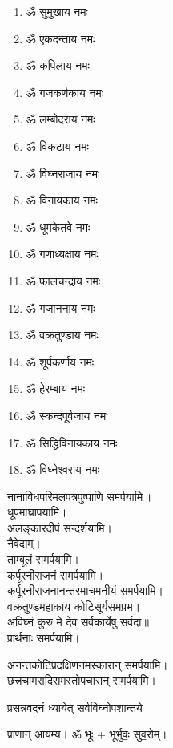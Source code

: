 \setlength{\columnseprule}{0pt}
\renewcommand{\labelenumi}{\devanumber\theenumi.}
\begin{multicols}{2}
\begin{enumerate}
\item ॐ सुमुखाय नमः
\item ॐ एकदन्ताय नमः
\item ॐ कपिलाय नमः
\item ॐ गजकर्णकाय नमः
\item ॐ लम्बोदराय नमः
\item ॐ विकटाय नमः
\item ॐ विघ्नराजाय नमः
\item ॐ विनायकाय नमः
\item ॐ धूमकेतवे नमः
\item ॐ गणाध्यक्षाय नमः
\item ॐ फालचन्द्राय नमः
\item ॐ गजाननाय नमः
\item ॐ वक्रतुण्डाय नमः
\item ॐ शूर्पकर्णाय नमः
\item ॐ हेरम्बाय नमः
\item ॐ स्कन्दपूर्वजाय नमः
\item ॐ सिद्धिविनायकाय नमः
\item ॐ विघ्नेश्वराय नमः
\end{enumerate}
\end{multicols}
नानाविधपरिमलपत्रपुष्पाणि समर्पयामि॥\\
धूपमाघ्रापयामि।\\
अलङ्कारदीपं सन्दर्शयामि।\\
नैवेद्यम्।\\
ताम्बूलं समर्पयामि।\\
कर्पूरनीराजनं समर्पयामि।\\
कर्पूरनीराजनानन्तरमाचमनीयं समर्पयामि।\\
{वक्रतुण्डमहाकाय कोटिसूर्यसमप्रभ।}\\
{अविघ्नं कुरु मे देव सर्वकार्येषु सर्वदा॥}\\
प्रार्थनाः समर्पयामि।

अनन्तकोटिप्रदक्षिणनमस्कारान् समर्पयामि।\\
छत्त्रचामरादिसमस्तोपचारान् समर्पयामि।\\


{प्रसन्नवदनं ध्यायेत् सर्वविघ्नोपशान्तये}
 
प्राणान्  आयम्य।  ॐ भूः + भूर्भुवः॒ सुव॒रोम्।


